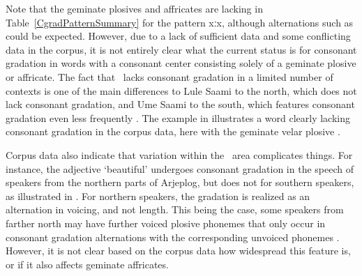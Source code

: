 Note that the geminate plosives and affricates \mbox{} are lacking in Table~\vref{CgradPatternSummary} for the pattern \mbox{xː\Div x}, although alternations such as \mbox{} could be expected. However, due to a lack of sufficient data and some conflicting data in the corpus, it is not entirely clear what the current status is for consonant gradation in words with a consonant center consisting solely of a geminate plosive or affricate. The fact that \PS\ lacks consonant gradation in a limited number of contexts is one of the main differences to Lule Saami to the north, which does not lack consonant gradation, and Ume Saami to the south, which features consonant gradation even less frequently \citep[cf.][21--23]{Sammallahti1998}. 
The example in  illustrates a word clearly lacking consonant gradation in the corpus data, here with the geminate velar plosive . 
\ea\label{CgradEx4a}%
\z

Corpus data also indicate that variation within the \PS\ area complicates things. For instance, the adjective  ‘beautiful’ undergoes consonant gradation in the speech of speakers from the northern parts of Arjeplog, but does not for southern speakers, as illustrated in . For northern speakers, the gradation is realized as an alternation in voicing, and not length. 
\ea\label{CgradEx4b}%
\z
This being the case, some speakers from farther north may have further voiced plosive phonemes \mbox{} that only occur in consonant gradation alternations with the corresponding unvoiced phonemes \mbox{}. However, it is not clear based on the corpus data how widespread this feature is, or if it also affects geminate affricates. 

